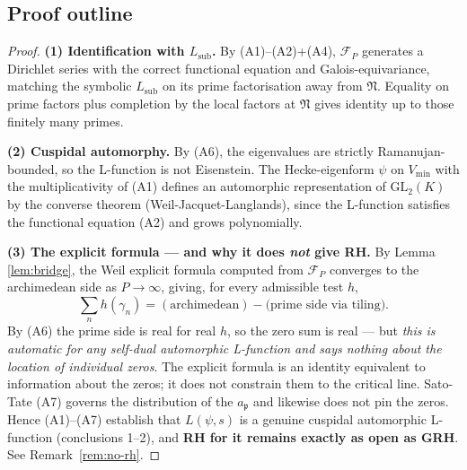 \documentclass[11pt,a4paper]{article}
\theoremstyle{definition}
\newcommand{\sub}{\mathrm{sub}}
\newcommand{\Vmin}{V_{\min}}
\begin{document}
\subsection{Proof outline}
\begin{proof}
\textbf{(1) Identification with $L_\sub$.}
By (A1)--(A2)+(A4), $\mathcal{F}_P$ generates a Dirichlet series with the
correct functional equation and Galois-equivariance, matching the symbolic
$L_\sub$ on its prime factorisation away from $\mathfrak{N}$. Equality on
prime factors plus completion by the local factors at $\mathfrak{N}$ gives
identity up to those finitely many primes.

\textbf{(2) Cuspidal automorphy.}
By (A6), the eigenvalues are strictly Ramanujan-bounded, so the L-function is
not Eisenstein. The Hecke-eigenform $\psi$ on $\Vmin$ with the multiplicativity
of (A1) defines an automorphic representation of $\mathrm{GL}_2(K)$ by the
converse theorem (Weil-Jacquet-Langlands), since the L-function satisfies the
functional equation (A2) and grows polynomially.

\textbf{(3) The explicit formula --- and why it does \emph{not} give RH.}
By Lemma \ref{lem:bridge}, the Weil explicit formula computed from
$\mathcal{F}_P$ converges to the archimedean side as $P\to\infty$, giving, for
every admissible test $h$,
$$
\sum_n h(\gamma_n) = (\text{archimedean}) - \text{(prime side via tiling)}.
$$
By (A6) the prime side is real for real $h$, so the zero sum is real --- but
\emph{this is automatic for any self-dual automorphic L-function and says
nothing about the location of individual zeros}. The explicit formula is an
identity equivalent to information about the zeros; it does not constrain them
to the critical line. Sato-Tate (A7) governs the distribution of the $a_\mathfrak{p}$
and likewise does not pin the zeros. Hence (A1)--(A7) establish that
$L(\psi,s)$ is a genuine cuspidal automorphic L-function (conclusions 1--2),
and \textbf{RH for it remains exactly as open as GRH}. See
Remark~\ref{rem:no-rh}.
\end{proof}
\end{document}

